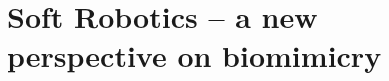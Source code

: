 \chapter[Soft Robotics -- a new perspective]{Soft Robotics -- a new \\ perspective on biomimicry}
\label{chap: chapter 0}
\vspace*{-5mm}

\ifx\printIntroduction\undefined
\else











%
%
%
%


\fi

